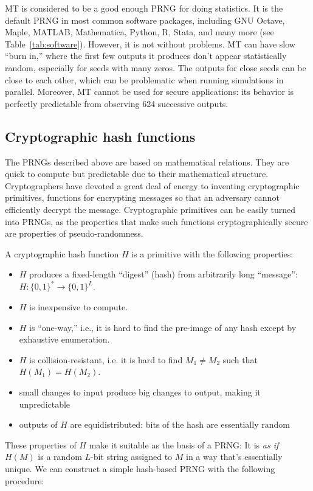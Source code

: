 \documentclass[graybox]{svmult}
\newcommand{\todo}[1]{{\color{red}{TO DO: \sc #1}}}
\begin{document}
MT is considered to be a good enough PRNG for doing statistics.
It is the default PRNG in most common software packages, including GNU Octave, Maple, MATLAB, Mathematica, Python, R, Stata, and many more (see Table~\ref{tab:software}).
However, it is not without problems.
MT can have slow ``burn in,'' where the first few outputs it produces don't appear statistically random, especially for seeds with many zeros. \todo{CITE}
The outputs for close seeds can be close to each other, which can be problematic when running simulations in parallel. 
Moreover, MT cannot be used for secure applications: its behavior is perfectly predictable from observing 624 successive outputs.


\subsection{Cryptographic hash functions}
The PRNGs described above are based on mathematical relations.
They are quick to compute but predictable due to their mathematical structure.
Cryptographers have devoted a great deal of energy to inventing cryptographic primitives,
functions for encrypting messages so that an adversary cannot efficiently decrypt the message.
Cryptographic primitives can be easily turned into PRNGs, as the properties that make such functions cryptographically secure
are properties of pseudo-randomness.

A cryptographic hash function $H$ is a primitive with the following properties:

\begin{itemize}
\item $H$ produces a fixed-length ``digest'' (hash) from arbitrarily long ``message'': $H:\{0, 1\}^* \rightarrow \{0, 1\}^L$.
\item $H$ is inexpensive to compute.
\item $H$ is ``one-way,'' i.e., it is hard to find the pre-image of any hash except by exhaustive enumeration.
\item $H$ is collision-resistant, i.e. it is hard to find $M_1 \ne M_2$ such that $H(M_1) = H(M_2)$.
\item small changes to input produce big changes to output, making it unpredictable
\item outputs of $H$ are equidistributed: bits of the hash are essentially random 
\end{itemize}

These properties of $H$ make it suitable as the basis of a PRNG:
It is \emph{as if} $H(M)$ is a random $L$-bit string assigned to $M$ in a way that's essentially unique.
We can construct a simple hash-based PRNG with the following procedure:
\end{document}
